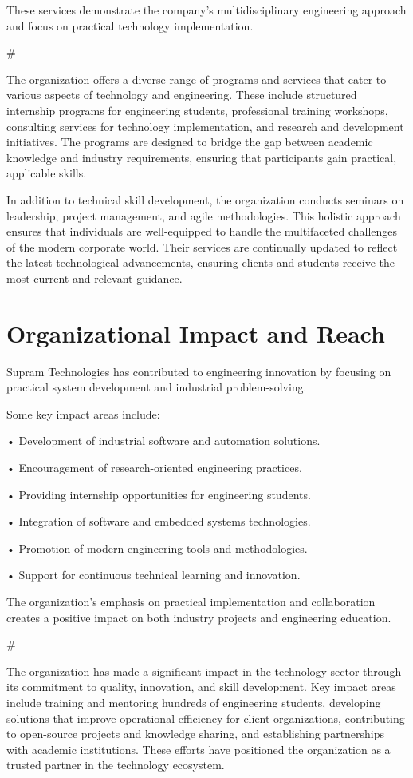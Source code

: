 \documentclass[12pt,a4paper]{report}
\begin{document}
These services demonstrate the company’s multidisciplinary engineering approach and focus on practical technology implementation.


\#


The organization offers a diverse range of programs and services that cater to various aspects of technology and engineering. These include structured internship programs for engineering students, professional training workshops, consulting services for technology implementation, and research and development initiatives. The programs are designed to bridge the gap between academic knowledge and industry requirements, ensuring that participants gain practical, applicable skills.


In addition to technical skill development, the organization conducts seminars on leadership, project management, and agile methodologies. This holistic approach ensures that individuals are well-equipped to handle the multifaceted challenges of the modern corporate world. Their services are continually updated to reflect the latest technological advancements, ensuring clients and students receive the most current and relevant guidance.


\section{Organizational Impact and Reach}

Supram Technologies has contributed to engineering innovation by focusing on practical system development and industrial problem-solving.


Some key impact areas include:


• Development of industrial software and automation solutions.


• Encouragement of research-oriented engineering practices.


• Providing internship opportunities for engineering students.


• Integration of software and embedded systems technologies.


• Promotion of modern engineering tools and methodologies.


• Support for continuous technical learning and innovation.


The organization’s emphasis on practical implementation and collaboration creates a positive impact on both industry projects and engineering education.


\#


The organization has made a significant impact in the technology sector through its commitment to quality, innovation, and skill development. Key impact areas include training and mentoring hundreds of engineering students, developing solutions that improve operational efficiency for client organizations, contributing to open-source projects and knowledge sharing, and establishing partnerships with academic institutions. These efforts have positioned the organization as a trusted partner in the technology ecosystem.
\end{document}
